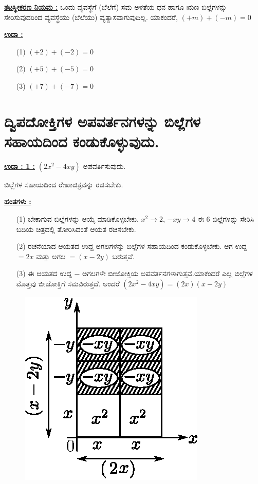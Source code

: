 \noindent
{\textbf{\underline{ತಟಸ್ಥೀಕರಣ ನಿಯಮ :}}} ಒಂದು ವ್ಯವಸ್ಥೆಗೆ (ಬೆಲೆಗೆ) ಸಮ ಅಳತೆಯ ಧನ ಹಾಗೂ ಋಣ ಬಿಲ್ಲೆಗಳನ್ನು ಸೇರಿಸುವುದರಿಂದ ವ್ಯವಸ್ಥೆಯು (ಬೆಲೆಯು) ವ್ಯತ್ಯಾಸವಾಗುವುದಿಲ್ಲ. ಯಾಕಂದರೆ, $(+m) + (-m) = 0$

\noindent
{\textbf{\underline{ಉದಾ :}}}
\begin{itemize}
\item [(1)] $(+2) + (-2) = 0$
\item [(2)] $(+5) + (-5) = 0$
\item [(3)] $(+7) + (-7) = 0$
\end{itemize}

\section*{ದ್ವಿಪದೋಕ್ತಿಗಳ ಅಪವರ್ತನಗಳನ್ನು ಬಿಲ್ಲೆಗಳ ಸಹಾಯದಿಂದ ಕಂಡುಕೊಳ್ಳುವುದು.}

\noindent
{\textbf{\underline{ಉದಾ : 1 :}}} $(2x^2 - 4xy)$ ಅಪವರ್ತಿಸುವುದು.

ಬಿಲ್ಲೆಗಳ ಸಹಾಯದಿಂದ ರೇಖಾಚಿತ್ರವನ್ನು ರಚಿಸಬೇಕು. 

\noindent
{\textbf{\underline{ಹಂತಗಳು :}}}
\begin{itemize}
\item [(1)] ಬೇಕಾಗುವ ಬಿಲ್ಲೆಗಳನ್ನು ಆಯ್ಕೆ ಮಾಡಿಕೊಳ್ಳಬೇಕು. $x^2 \rightarrow 2$, $-xy \rightarrow 4$ ಈ 6 ಬಿಲ್ಲೆಗಳನ್ನು ಸೇರಿಸಿ ಬದಿಯ ಚಿತ್ರದಲ್ಲಿ ತೋರಿಸಿದಂತೆ ಆಯತ ರಚಿಸಬೇಕು. 
\item [(2)] ರಚನೆಯಾದ ಆಯತದ ಉದ್ದ ಅಗಲಗಳನ್ನು ಬಿಲ್ಲೆಗಳ ಸಹಾಯದಿಂದ ಕಂಡುಕೊಳ್ಳಬೇಕು. ಆಗ ಉದ್ದ $= 2x$ ಮತ್ತು ಅಗಲ $= (x-2y)$ ಬರುತ್ತವೆ. 
\item [(3)] ಈ ಆಯತದ ಉದ್ದ $-$ ಅಗಲಗಳೇ ಬೀಜೋಕ್ತಿಯ ಅಪವರ್ತನಗಳಾಗುತ್ತವೆ.\break ಯಾಕಂದರೆ ಎಲ್ಲ ಬಿಲ್ಲೆಗಳ ಮೊತ್ತವು ಬೀಜೋಕ್ತಿಗೆ ಸಮವಿರುತ್ತದೆ. ಅಂದರೆ $(2x^2 - 4xy) = (2x)(x-2y)$
\end{itemize}
\begin{figure}[H]
\centering
\includegraphics[scale=0.9]{src/figure/chap3/fig3-34b.eps}
\end{figure}

